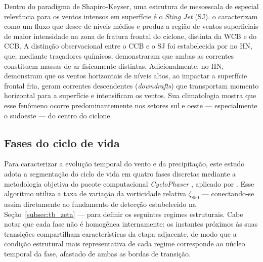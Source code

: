 Dentro do paradigma de Shapiro-Keyser, uma estrutura de mesoescala de especial relevância para os ventos intensos em superfície é o \textit{Sting Jet} (SJ).
\citet{clark2005sting} o caracterizam como um fluxo que desce de níveis médios e produz a região de ventos superficiais de maior intensidade na zona de fratura frontal do ciclone, distinta da WCB e do CCB.
A distinção observacional entre o CCB e o SJ foi estabelecida por \citet{martinez2014cold} no HN, que, mediante traçadores químicos, demonstraram que ambas as correntes constituem massas de ar fisicamente distintas.
Adicionalmente, no HN, \citet{hyeok2024extrem} demonstram que os ventos horizontais de níveis altos, ao impactar a superfície frontal fria, geram correntes descendentes (\textit{downdrafts}) que transportam momento horizontal para a superfície e intensificam os ventos. Sua climatologia mostra que esse fenômeno ocorre predominantemente nos setores sul e oeste — especialmente o sudoeste — do centro do ciclone.

\subsection{Fases do ciclo de vida}\label{subsec:tb_fases}

Para caracterizar a evolução temporal do vento e da precipitação, este estudo adota a segmentação do ciclo de vida em quatro fases discretas mediante a metodologia objetiva do pacote computacional \textit{CycloPhaser} \citep{deSouza2025CycloPhaser}, aplicado por \citet{coutodesouza2024new}. Esse algoritmo utiliza a taxa de variação da vorticidade relativa $\zeta_{850}$ — conectando-se assim diretamente ao fundamento de detecção estabelecido na Seção~\ref{subsec:tb_zeta} — para definir os seguintes regimes estruturais. Cabe notar que cada fase não é homogênea internamente: os instantes próximos às suas transições compartilham características da etapa adjacente, de modo que a condição estrutural mais representativa de cada regime corresponde ao núcleo temporal da fase, afastado de ambas as bordas de transição.

